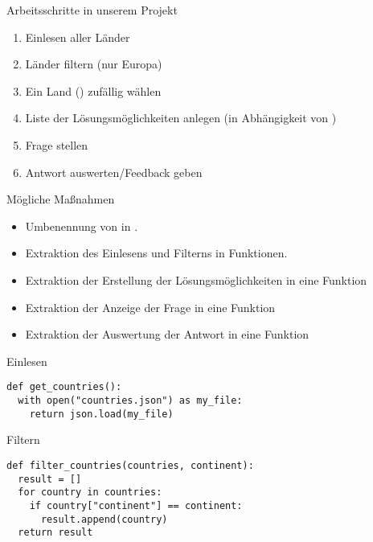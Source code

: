 \begin{frame}
	
\begin{block}{Arbeitsschritte in unserem Projekt}
\vspace{2pt}
\pause 
\begin{enumerate}[<+->]
	\item Einlesen aller Länder
	\item Länder filtern (nur Europa)
	\item Ein Land () zufällig wählen
	\item Liste der Lösungsmöglichkeiten anlegen (in Abhängigkeit von )
	\item Frage stellen
	\item Antwort auswerten/Feedback geben
\end{enumerate}
\end{block}
	
\end{frame}

\begin{frame}
	\begin{block}{Mögliche Maßnahmen}
		\vspace{2pt}
	\pause 
	\begin{itemize}[<+->]
	\item Umbenennung von  in .
	\item Extraktion des Einlesens und Filterns in Funktionen.
    \item Extraktion der Erstellung der Lösungsmöglichkeiten in eine Funktion
    \item Extraktion der Anzeige der Frage in eine Funktion
    \item Extraktion der Auswertung der Antwort in eine Funktion 
	\end{itemize}	
	\end{block}
\end{frame}


\begin{fragile}

\begin{block}{Einlesen}
\vspace{2pt}
\begin{verbatim}
def get_countries():
  with open("countries.json") as my_file:
    return json.load(my_file)
\end{verbatim}
\end{block}

\vspace{12pt}
\pause 

\begin{block}{Filtern}
\vspace{2pt}
\begin{verbatim}
def filter_countries(countries, continent):
  result = []
  for country in countries:
    if country["continent"] == continent:
      result.append(country)
  return result
\end{verbatim}
\end{block}

\end{fragile}

